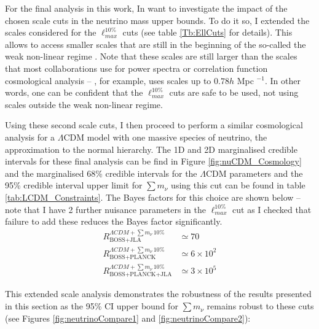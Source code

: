 \qquad For the final analysis in this work, In want to investigate the impact of the chosen scale cuts in the neutrino mass upper bounds. To do it so, I extended the scales considered for the $\ell_{max}^{10\%}$ cuts (see table \ref{Tb:EllCuts} for details). This allows to access smaller scales that are still in the beginning of the so-called the weak non-linear regime \citep{Thomas2010Neutr,Bird2012}. Note that these scales are still larger than the scales that most collaborations use for power spectra or correlation function cosmological analysis \citep{Ho2012,2016BOSSCosmology,2017MNRAS.465.1454H,2017arXiv170801530D} -- \cite{2017arXiv170801530D}, for example, uses scales up to $0.78h$ Mpc $^{-1}$. In other words, one can be confident that the $\ell_{max}^{10\%}$ cuts are safe to be used, not using scales outside the weak non-linear regime. 


\qquad Using these second scale cuts, I then proceed to perform a similar cosmological analysis for a $\Lambda$CDM model with one massive species of neutrino, the approximation to the normal hierarchy. The 1D and 2D marginalised credible intervals for these final analysis can be find in Figure \ref{fig:nuCDM_Cosmology} and the marginalised 68\% credible intervals for the $\Lambda$CDM parameters and the 95\% credible interval upper limit for $\sum m_{\nu}$ using this cut can be found in table \ref{tab:LCDM_Constraints}. The Bayes factors for this choice are shown below -- note that I have 2 further nuisance parameters in the $\ell_{max}^{10\%}$ cut as I checked that failure to add these reduces the Bayes factor significantly.
\begin{align}
R_{\scriptscriptstyle\text{BOSS+JLA}}^{\Lambda CDM + \sum m_{\nu} \, 10\%} & \simeq 70  \\
R_{\scriptscriptstyle\text{BOSS+PLANCK}}^{\Lambda CDM +\sum m_{\nu} \, 10\%} & \simeq 6 \times 10^2 \\
R_{\scriptscriptstyle\text{BOSS+PLANCK+JLA}}^{\Lambda CDM +\sum m_{\nu} \, 10\%} & \simeq 3 \times 10^5
\end{align}

\qquad This extended scale analysis demonstrates the robustness of the results presented in this section as the 95\% CI upper bound for $\sum m_{\nu}$ remains robust to these cuts (see Figures \ref{fig:neutrinoCompare1} and \ref{fig:neutrinoCompare2}):




